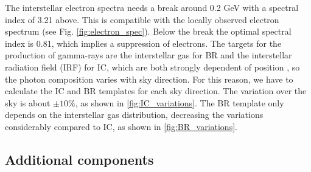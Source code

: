 The interstellar electron spectra needs a break around 0.2 GeV with a spectral index of 3.21 above. This is compatible with the locally observed electron spectrum (see Fig. \ref{fig:electron_spec}). Below the break the optimal spectral index is 0.81, which implies a suppression of electrons. %
The targets for the production of gamma-rays are the interstellar gas for BR and the interstellar radiation field (IRF) for IC, which are both strongly dependent of position%
, so the photon composition varies with sky direction.
For this reason, we have to calculate the IC and BR templates for each sky direction. The variation over the sky is about $\pm 10\%$, as shown in \ref{fig:IC_variations}. 
The BR template only depends on the interstellar gas distribution, decreasing the variations considerably compared to IC, as shown in \ref{fig:BR_variations}.







\subsection{Additional components}

